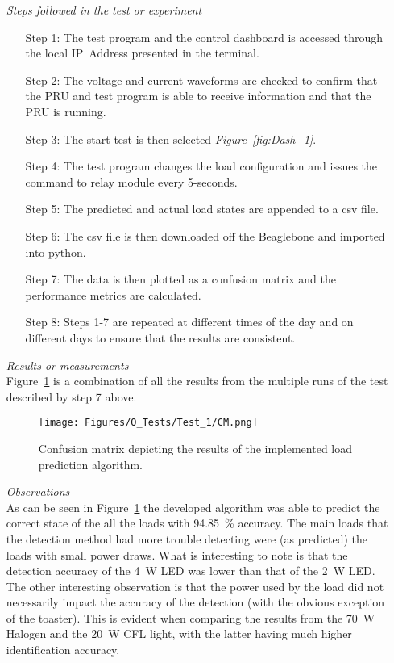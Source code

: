 \begin{itemize}
    \item [\emph{Steps followed in the test or experiment}]\mbox{}
    \begin{itemize}
        \item [Step 1:] The test program and the control dashboard is accessed through the local IP~Address presented in the terminal.
        \item [Step 2:] The voltage and current waveforms are checked to confirm that the PRU and test program is able to receive information and that the PRU is running.
        \item [Step 3:] The start test is then selected \emph{Figure~\ref{fig:Dash_1}}.
        \item [Step 4:] The test program changes the load configuration and issues the command to relay module every 5-seconds.   
        \item [Step 5:] The predicted and actual load states are appended to a csv file.
        \item [Step 6:] The csv file is then downloaded off the Beaglebone and imported into python.
        \item [Step 7:] The data is then plotted as a confusion matrix and the performance metrics are calculated.
        \item [Step 8:] Steps 1-7 are repeated at different times of the day and on different days to ensure that the results are consistent.
    \end{itemize}
    \item [\emph{Results or measurements}]\mbox{}\\
    Figure~\ref{fig:CM_Qtest_1} is a combination of all the results from the multiple runs of the test described by step 7 above.
    \begin{figure}[H]
        \centering
        \texttt{[image: Figures/Q\_Tests/Test\_1/CM.png]}
        \caption{Confusion matrix depicting the results of the implemented load prediction algorithm.}
        \label{fig:CM_Qtest_1}
    \end{figure}
    \item [\emph{Observations}]\mbox{}\\
    As can be seen in Figure~\ref{fig:CM_Qtest_1} the developed algorithm was able to predict the correct state of the all the loads with \qty{94.85}{\percent} accuracy.  The main loads that the detection method had more trouble detecting were (as predicted) the loads with small power draws. What is interesting to note is that the detection accuracy of the \qty{4}{\watt} LED was lower than that of the \qty{2}{\watt} LED. The other interesting observation is that the power used by the load did not necessarily impact the accuracy of the detection (with the obvious exception of the toaster). This is evident when comparing the results from the \qty{70}{\watt} Halogen and the \qty{20}{\watt} CFL light, with the latter having much higher identification accuracy. 
\end{itemize}
